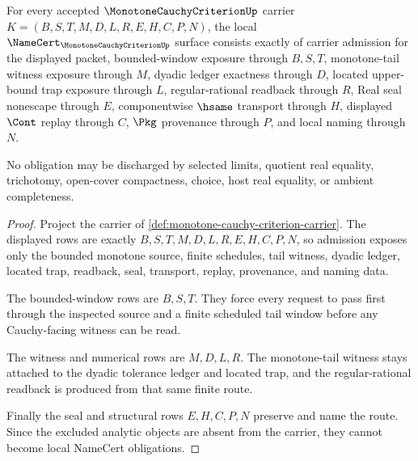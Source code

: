 \begin{theorem}
\label{thm:monotone-cauchy-criterion-namecert-obligations}
For every accepted $\MonotoneCauchyCriterionUp$ carrier $K=(B,S,T,M,D,L,R,E,H,C,P,N)$, the local $\NameCert_{\MonotoneCauchyCriterionUp}$ surface consists exactly of carrier admission for the displayed packet, bounded-window exposure through $B,S,T$, monotone-tail witness exposure through $M$, dyadic ledger exactness through $D$, located upper-bound trap exposure through $L$, regular-rational readback through $R$, Real seal nonescape through $E$, componentwise $\hsame$ transport through $H$, displayed $\Cont$ replay through $C$, $\Pkg$ provenance through $P$, and local naming through $N$.

No obligation may be discharged by selected limits, quotient real equality, trichotomy, open-cover compactness, choice, host real equality, or ambient completeness.
\end{theorem}
\begin{proof}
Project the carrier of \autoref{def:monotone-cauchy-criterion-carrier}. The displayed rows are exactly $B,S,T,M,D,L,R,E,H,C,P,N$, so admission exposes only the bounded monotone source, finite schedules, tail witness, dyadic ledger, located trap, readback, seal, transport, replay, provenance, and naming data.

The bounded-window rows are $B,S,T$. They force every request to pass first through the inspected source and a finite scheduled tail window before any Cauchy-facing witness can be read.

The witness and numerical rows are $M,D,L,R$. The monotone-tail witness stays attached to the dyadic tolerance ledger and located trap, and the regular-rational readback is produced from that same finite route.

Finally the seal and structural rows $E,H,C,P,N$ preserve and name the route. Since the excluded analytic objects are absent from the carrier, they cannot become local NameCert obligations.
\end{proof}

